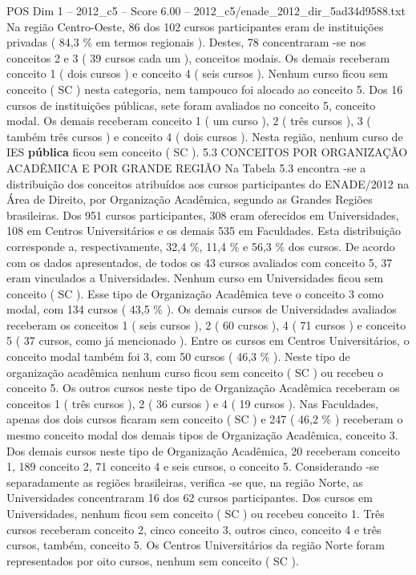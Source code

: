 \begin{textsample}{POS Dim 1 – 2012\_c5 – Score 6.00 – 2012\_c5/enade\_2012\_dir\_5ad34d9588.txt}
Na região Centro-Oeste, 86 dos 102 cursos participantes eram de instituições privadas ( 84,3 \% em termos regionais ).
Destes, 78 concentraram -se nos conceitos 2 e 3 ( 39 cursos cada um ), conceitos modais.
Os demais receberam conceito 1 ( dois cursos ) e conceito 4 ( seis cursos ).
Nenhum curso ficou sem conceito ( SC ) nesta categoria, nem tampouco foi alocado ao conceito 5.
Dos 16 cursos de instituições públicas, sete foram avaliados no conceito 5, conceito modal.
Os demais receberam conceito 1 ( um curso ), 2 ( três cursos ), 3 ( também três cursos ) e conceito 4 ( dois cursos ).
Nesta região, nenhum curso de IES \textbf{pública} ficou sem conceito ( SC ). 5.3 CONCEITOS POR ORGANIZAÇÃO ACADÊMICA E POR GRANDE REGIÃO Na Tabela 5.3 encontra -se a distribuição dos conceitos atribuídos aos cursos participantes do ENADE/2012 na Área de Direito, por Organização Acadêmica, segundo as Grandes Regiões brasileiras.
Dos 951 cursos participantes, 308 eram oferecidos em Universidades, 108 em Centros Universitários e os demais 535 em Faculdades.
Esta distribuição corresponde a, respectivamente, 32,4 \%, 11,4 \% e 56,3 \% dos cursos.
De acordo com os dados apresentados, de todos os 43 cursos avaliados com conceito 5, 37 eram vinculados a Universidades.
Nenhum curso em Universidades ficou sem conceito ( SC ).
Esse tipo de Organização Acadêmica teve o conceito 3 como modal, com 134 cursos ( 43,5 \% ).
Os demais cursos de Universidades avaliados receberam os conceitos 1 ( seis cursos ), 2 ( 60 cursos ), 4 ( 71 cursos ) e conceito 5 ( 37 cursos, como já mencionado ).
Entre os cursos em Centros Universitários, o conceito modal também foi 3, com 50 cursos ( 46,3 \% ).
Neste tipo de organização acadêmica nenhum curso ficou sem conceito ( SC ) ou recebeu o conceito 5.
Os outros cursos neste tipo de Organização Acadêmica receberam os conceitos 1 ( três cursos ), 2 ( 36 cursos ) e 4 ( 19 cursos ).
Nas Faculdades, apenas dos dois cursos ficaram sem conceito ( SC ) e 247 ( 46,2 \% ) receberam o mesmo conceito modal dos demais tipos de Organização Acadêmica, conceito 3.
Dos demais cursos neste tipo de Organização Acadêmica, 20 receberam conceito 1, 189 conceito 2, 71 conceito 4 e seis cursos, o conceito 5.
Considerando -se separadamente as regiões brasileiras, verifica -se que, na região Norte, as Universidades concentraram 16 dos 62 cursos participantes.
Dos cursos em Universidades, nenhum ficou sem conceito ( SC ) ou recebeu conceito 1.
Três cursos receberam conceito 2, cinco conceito 3, outros cinco, conceito 4 e três cursos, também, conceito 5.
Os Centros Universitários da região Norte foram representados por oito cursos, nenhum sem conceito ( SC ).

\end{textsample}
